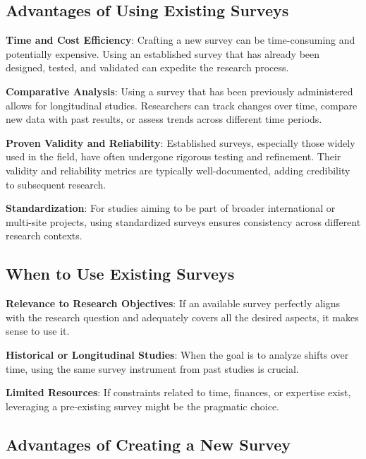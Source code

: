 \documentclass[
  b5paper]{book}
\begin{document}
\hypertarget{advantages-of-using-existing-surveys}{%
\subsection*{Advantages of Using Existing Surveys}\label{advantages-of-using-existing-surveys}}

\textbf{Time and Cost Efficiency}: Crafting a new survey can be time-consuming and potentially expensive.
Using an established survey that has already been designed, tested, and validated can expedite the research process.

\textbf{Comparative Analysis}: Using a survey that has been previously administered allows for longitudinal studies.
Researchers can track changes over time, compare new data with past results, or assess trends across different time periods.

\textbf{Proven Validity and Reliability}: Established surveys, especially those widely used in the field, have often undergone rigorous testing and refinement.
Their validity and reliability metrics are typically well-documented, adding credibility to subsequent research.

\textbf{Standardization}: For studies aiming to be part of broader international or multi-site projects, using standardized surveys ensures consistency across different research contexts.

\hypertarget{when-to-use-existing-surveys}{%
\subsection*{When to Use Existing Surveys}\label{when-to-use-existing-surveys}}

\textbf{Relevance to Research Objectives}: If an available survey perfectly aligns with the research question and adequately covers all the desired aspects, it makes sense to use it.

\textbf{Historical or Longitudinal Studies}: When the goal is to analyze shifts over time, using the same survey instrument from past studies is crucial.

\textbf{Limited Resources}: If constraints related to time, finances, or expertise exist, leveraging a pre-existing survey might be the pragmatic choice.

\hypertarget{advantages-of-creating-a-new-survey}{%
\subsection*{Advantages of Creating a New Survey}\label{advantages-of-creating-a-new-survey}}
\end{document}
